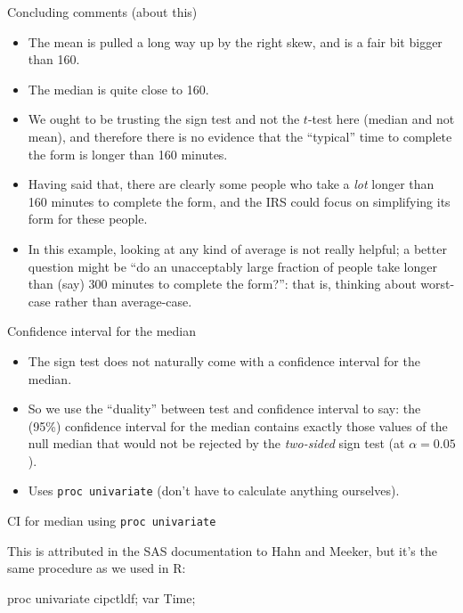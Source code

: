 \documentclass[unknownkeysallowed]{beamer}\usepackage[]{graphicx}\usepackage[]{color}
\begin{document}
\begin{frame}[fragile]{Concluding comments (about this)}
  
  \begin{itemize}
  \item The mean is pulled a long way up by the right skew, and is a
    fair bit bigger than 160.
  \item The median is quite close to 160.
  \item We ought to be trusting the sign test and not the $t$-test
    here (median and not mean), and therefore there is no evidence
    that the ``typical'' time to complete the form is longer than 160
    minutes. 
  \item Having said that, there are clearly some people who take a
    \emph{lot} longer than 160 minutes to complete the form, and the
    IRS could focus on simplifying its form for these people.
  \item In this example, looking at any kind of average is not really
    helpful; a better question might be ``do an unacceptably large
    fraction of people take longer than (say) 300 minutes to complete
    the form?'': that is, thinking about worst-case rather than
    average-case.
  \end{itemize}
  
\end{frame}

\begin{frame}[fragile]{Confidence interval for the median}
  
  \begin{itemize}
  \item The sign test does not naturally come with a confidence
    interval for the median.
  \item So we use the ``duality'' between test and confidence interval
    to say: the (95\%) confidence interval for the median contains
    exactly those values of the null median that would not be rejected
    by the \emph{two-sided} sign test (at $\alpha=0.05$).
  \item Uses \texttt{proc univariate} (don't have to calculate
    anything ourselves).
  \end{itemize}
  
\end{frame}

\begin{frame}[fragile]{CI for median using \texttt{proc univariate}}

  This is attributed in the SAS documentation to Hahn and Meeker, but
  it's the same procedure as we used in R:
  
    \begin{Sascode}[store=pevay]
proc univariate cipctldf;
  var Time;
    \end{Sascode}
    

    
\end{frame}
\end{document}
